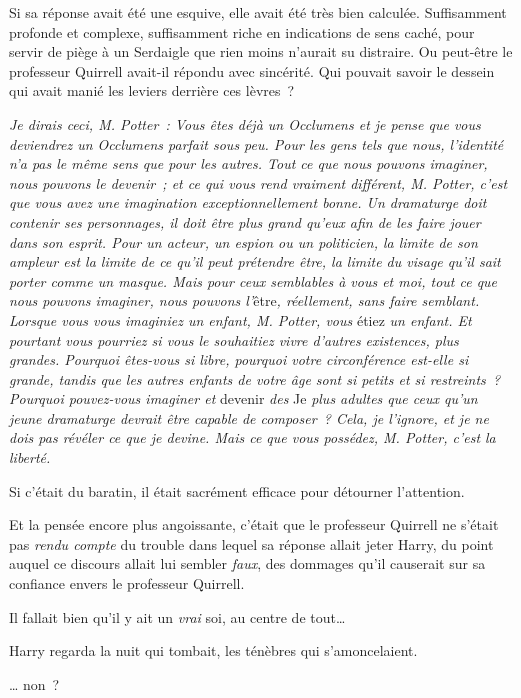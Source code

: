Si sa réponse avait été une esquive, elle avait été très bien calculée. Suffisamment profonde et complexe, suffisamment riche en indications de sens caché, pour servir de piège à un Serdaigle que rien moins n'aurait su distraire. Ou peut-être le professeur Quirrell avait-il répondu avec sincérité. Qui pouvait savoir le dessein qui avait manié les leviers derrière ces lèvres~?

\emph{Je dirais ceci, M. Potter~: Vous êtes déjà un Occlumens et je pense que vous deviendrez un Occlumens parfait sous peu. Pour les gens tels que nous, l'identité n'a pas le même sens que pour les autres. Tout ce que nous pouvons imaginer, nous pouvons le devenir~; et ce qui vous rend vraiment différent, M. Potter, c'est que vous avez une imagination exceptionnellement bonne. Un dramaturge doit contenir ses personnages, il doit être plus grand qu'eux afin de les faire jouer dans son esprit. Pour un acteur, un espion ou un politicien, la limite de son ampleur est la limite de ce qu'il peut prétendre être, la limite du visage qu'il sait porter comme un masque. Mais pour ceux semblables à vous et moi, tout ce que nous pouvons imaginer, nous pouvons l'}être\emph{, réellement, sans faire semblant. Lorsque vous vous imaginiez un enfant, M. Potter, vous} étiez \emph{un enfant. Et pourtant vous pourriez si vous le souhaitiez vivre d'autres existences, plus grandes. Pourquoi êtes-vous si libre, pourquoi votre circonférence est-elle si grande, tandis que les autres enfants de votre âge sont si petits et si restreints~? Pourquoi pouvez-vous imaginer et} devenir \emph{des} Je \emph{plus adultes que ceux qu'un jeune dramaturge devrait être capable de composer~? Cela, je l'ignore, et je ne dois pas révéler ce que je devine. Mais ce que vous possédez, M. Potter, c'est la liberté.}

Si c'était du baratin, il était sacrément efficace pour détourner l'attention.

Et la pensée encore plus angoissante, c'était que le professeur Quirrell ne s'était pas \emph{rendu compte} du trouble dans lequel sa réponse allait jeter Harry, du point auquel ce discours allait lui sembler \emph{faux}, des dommages qu'il causerait sur sa confiance envers le professeur Quirrell.

Il fallait bien qu'il y ait un \emph{vrai} soi, au centre de tout…

Harry regarda la nuit qui tombait, les ténèbres qui s'amoncelaient.

… non~?

\later


